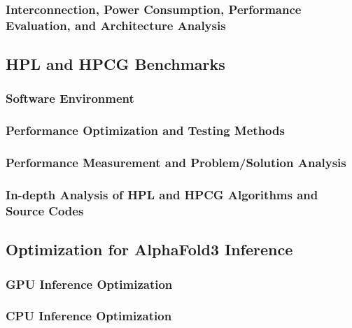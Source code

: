 \documentclass[a4paper,12pt]{article}
\begin{document}
\subsubsection{Interconnection, Power Consumption, Performance Evaluation, and Architecture Analysis}

\subsection{HPL and HPCG Benchmarks}

\subsubsection{Software Environment}

\subsubsection{Performance Optimization and Testing Methods}

\subsubsection{Performance Measurement and Problem/Solution Analysis}

\subsubsection{In-depth Analysis of HPL and HPCG Algorithms and Source Codes}

\subsection{Optimization for AlphaFold3 Inference}

\subsubsection{GPU Inference Optimization}

\subsubsection{CPU Inference Optimization}
\end{document}
